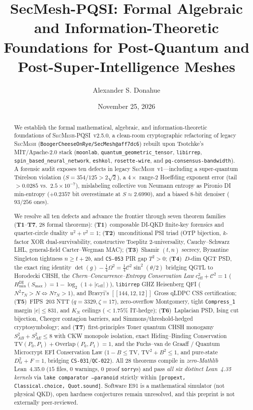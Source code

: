 \documentclass[11pt,reqno]{amsart}
\title[SecMesh-PQSI: Formal Algebraic and Information-Theoretic Foundations]{%
  SecMesh-PQSI: Formal Algebraic and Information-Theoretic\\
  Foundations for Post-Quantum and Post-Super-Intelligence Meshes}
\author{Alexander S. Donahue}
\date{November 25, 2026}
\theoremstyle{definition}
\newcommand{\Hmin}{H_{\min}^{\mathrm{DI}}}
\newcommand{\Con}{\mathcal{C}}
\newcommand{\code}[1]{\texttt{\small #1}}
\begin{document}
\begin{abstract}
We establish the formal mathematical, algebraic, and information-theoretic foundations of \textsc{SecMesh-PQSI}~v2.5.0, a clean-room cryptographic refactoring of legacy \textsc{SecMesh} (\code{BoogerCheeseOnRye/SecMesh@aff7dc6}) rebuilt upon Tsotchke's MIT/Apache-2.0 stack (\code{moonlab}, \code{quantum\_geometric\_tensor}, \code{libirrep}, \code{spin\_based\_neural\_network}, \code{eshkol}, \code{rosette-wire}, and \code{pq-consensus-bandwidth}).
A forensic audit exposes ten defects in legacy \textsc{SecMesh}~v1---including a super-quantum Tsirelson violation ($S=354/125 > 2\sqrt{2}$), a $4\times$ range-$2$ Hoeffding exponent error (tail $>0.0285$ vs.\ $2.5\times 10^{-7}$), mislabeling collective von Neumann entropy as Pironio DI min-entropy ($+0.2357$ bit overestimate at $S\approx 2.6990$), and a biased $8$-bit denoiser ($93/256$ ones).

We resolve all ten defects and advance the frontier through seven theorem families (\textbf{T1}--\textbf{T7}, $28$ formal theorems):
(\textbf{T1})~composable DI-QKD finite-key forensics and quarter-circle duality $u^2+v^2=1$;
(\textbf{T2})~unconditional PSI triad (OTP bijection, $k$-factor XOR dual-survivability, constructive Toeplitz $2$-universality, Cauchy--Schwarz LHL, general-field Carter--Wegman MAC);
(\textbf{T3})~Shamir $(t,n)$ secrecy, Byzantine Singleton tightness $n\ge t+2b$, and \code{CS-053} PIR gap $T^2>0$;
(\textbf{T4})~$D$-dim QGT PSD, the exact ring identity $\det(g)-\frac{1}{4}\Omega^2 = \frac{1}{4}\Con^2\sin^2(\theta/2)$ bridging QGTL to Horodecki CHSH, the \emph{Chern--Concurrence--Entropy Conservation Law} $c_{\mathrm{eff}}^2+\Con^2=1$ ($\Hmin(S_{\max})=1-\log_2(1+|c_{\mathrm{eff}}|)$), \code{libirrep} GHZ Heisenberg QFI ($N^2\tau_N > N \iff N\tau_N > 1$), and Bravyi's $[[144,12,12]]$ Gross qLDPC CSS certification;
(\textbf{T5})~FIPS~203 NTT ($q=3329,\zeta=17$), zero-overflow Montgomery, tight \code{Compress\_1} margin $|e|\le 831$, and $K_N$ ceilings ($<1.75\%$ IT-hedge);
(\textbf{T6})~Laplacian PSD, Ising cut bijection, Cheeger contagion barriers, and Simmons/threshold-hedged cryptosymbology; and
(\textbf{T7})~first-principles Toner quantum CHSH monogamy $S_{AB}^2+S_{AE}^2 \le 8$ with CKW monopole isolation, exact Hiding--Binding Conservation $\mathrm{TV}(P_0,P_1)+\mathrm{Overlap}(P_0,P_1)=1$, and the Fuchs--van de Graaff / Quantum Microcrypt EFI Conservation Law ($1-B \le \mathrm{TV}$, $\mathrm{TV}^2+B^2 \le 1$, and pure-state $D_{\mathrm{tr}}^2+F=1$, bridging \code{CS-031}/\code{QC-022}).
All $28$ theorems compile in \emph{zero-Mathlib} Lean~4.35.0 ($15$ files, $0$ warnings, $0$ proof \code{sorry}s) and pass \emph{all six distinct Lean~4.35 kernels} via \code{lake comparator --paranoid} strictly within \code{[propext, Classical.choice, Quot.sound]}.
Software E91 is a mathematical simulator (not physical QKD), open hardness conjectures remain unresolved, and this preprint is not externally peer-reviewed.
\end{abstract}
\end{document}
